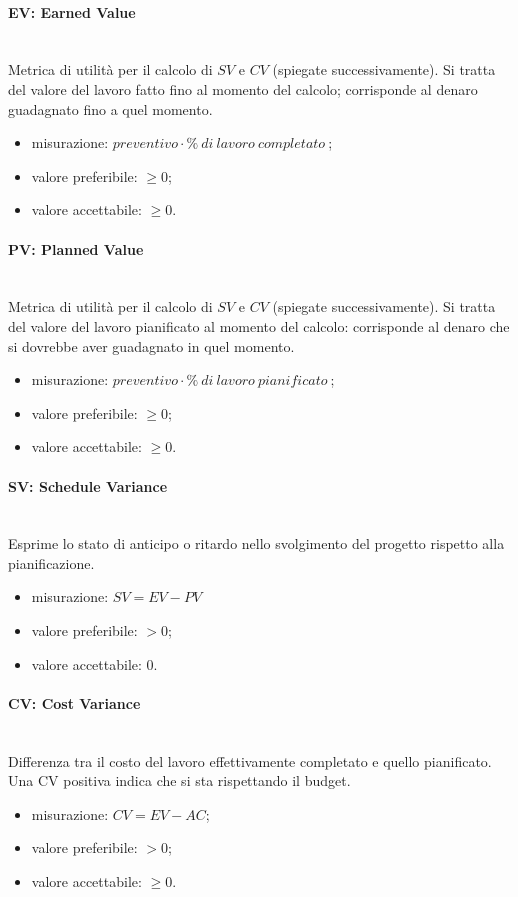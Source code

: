 			\paragraph*{EV: Earned Value}\mbox{}\\
			Metrica di utilità per il calcolo di $SV$ e $CV$ (spiegate successivamente). Si tratta del valore del lavoro fatto fino al momento del calcolo; corrisponde al denaro guadagnato fino a quel momento.
			\begin{itemize}
				\item  misurazione: $preventivo \cdot \%\ di\ lavoro\ completato\ $;
				\item  valore preferibile: $ \geq 0$;
				\item  valore accettabile: $ \geq 0$.
			\end{itemize}
			\paragraph*{PV: Planned Value}\mbox{}\\
			Metrica di utilità per il calcolo di $SV$ e $CV$ (spiegate successivamente). Si tratta del valore del lavoro pianificato al momento del calcolo: corrisponde al denaro che si dovrebbe aver guadagnato in quel momento.
			\begin{itemize}
				\item  misurazione: $preventivo \cdot \%\ di\ lavoro\ pianificato\ $;
				\item  valore preferibile: $ \geq 0$;
				\item  valore accettabile: $ \geq 0$.
			\end{itemize}			
			\paragraph*{SV: Schedule Variance}\mbox{}\\
			Esprime lo stato di anticipo o ritardo nello svolgimento del progetto rispetto alla pianificazione.
			\begin{itemize}
				\item misurazione: $SV = EV - PV$
				\item valore preferibile: $ > 0$;
				\item valore accettabile: 0.
			\end{itemize}
			\paragraph*{CV: Cost Variance}\mbox{}\\
			Differenza tra il costo del lavoro effettivamente completato e quello pianificato. Una CV positiva indica che si sta rispettando il budget.
			\begin{itemize}
				\item misurazione: $CV = EV - AC$;
				\item valore preferibile: $ > 0$;
				\item valore accettabile: $ \geq 0$.
			\end{itemize}

